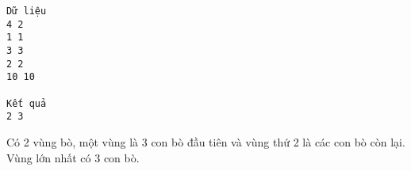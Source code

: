 \begin{verbatim}
Dữ liệu
4 2
1 1
3 3
2 2
10 10

Kết quả
2 3
\end{verbatim}
Có 2 vùng bò, một vùng là 3 con bò đầu tiên và vùng thứ 2 là các con bò còn lại. Vùng lớn nhất có 3 con bò.